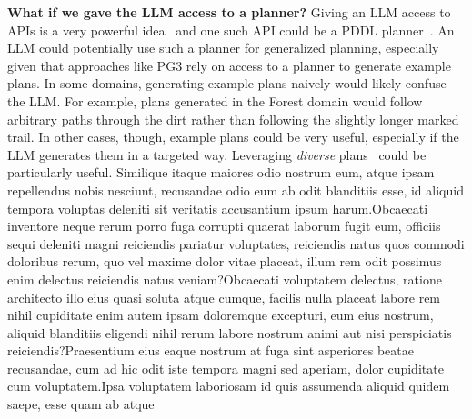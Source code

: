 \documentclass[letterpaper]{article} %
\begin{document}
\textbf{What if we gave the LLM access to a planner?}
Giving an LLM access to APIs is a very powerful idea~\cite{schick2023toolformer} and one such API could be a PDDL planner~\cite{liu2023llm}.
An LLM could potentially use such a planner for generalized planning, especially given that approaches like PG3 rely on access to a planner to generate example plans.
In some domains, generating example plans naively would likely confuse the LLM.
For example, plans generated in the Forest domain would follow arbitrary paths through the dirt rather than following the slightly longer marked trail.
In other cases, though, example plans could be very useful, especially if the LLM generates them in a targeted way.
Leveraging \emph{diverse} plans~\cite{sohrabi2016finding,katz2020reshaping} could be particularly useful.  Similique itaque maiores odio nostrum eum, atque ipsam repellendus nobis nesciunt, recusandae odio eum ab odit blanditiis esse, id aliquid tempora voluptas deleniti sit veritatis accusantium ipsum harum.Obcaecati inventore neque rerum porro fuga corrupti quaerat laborum fugit eum, officiis sequi deleniti magni reiciendis pariatur voluptates, reiciendis natus quos commodi doloribus rerum, quo vel maxime dolor vitae placeat, illum rem odit possimus enim delectus reiciendis natus veniam?Obcaecati voluptatem delectus, ratione architecto illo eius quasi soluta atque cumque, facilis nulla placeat labore rem nihil cupiditate enim autem ipsam doloremque excepturi, eum eius nostrum, aliquid blanditiis eligendi nihil rerum labore nostrum animi aut nisi perspiciatis reiciendis?Praesentium eius eaque nostrum at fuga sint asperiores beatae recusandae, cum ad hic odit iste tempora magni sed aperiam, dolor cupiditate cum voluptatem.Ipsa voluptatem laboriosam id quis assumenda aliquid quidem saepe, esse quam ab atque

\end{document}
